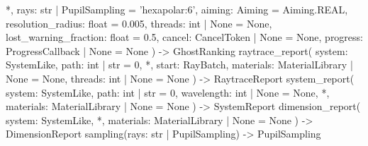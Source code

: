 \documentclass[11pt,a4paper,openany]{book}
\begin{document}
\begin{signatur}
    *,
    rays: str | PupilSampling = 'hexapolar:6',
    aiming: Aiming = Aiming.REAL,
    resolution_radius: float = 0.005,
    threads: int | None = None,
    lost_warning_fraction: float = 0.5,
    cancel: CancelToken | None = None,
    progress: ProgressCallback | None = None
) -> GhostRanking
raytrace_report(
    system: SystemLike,
    path: int | str = 0,
    *,
    start: RayBatch,
    materials: MaterialLibrary | None = None,
    threads: int | None = None
) -> RaytraceReport
system_report(
    system: SystemLike,
    path: int | str = 0,
    wavelength: int | None = None,
    *,
    materials: MaterialLibrary | None = None
) -> SystemReport
dimension_report(
    system: SystemLike,
    *,
    materials: MaterialLibrary | None = None
) -> DimensionReport
sampling(rays: str | PupilSampling) -> PupilSampling
\end{signatur}
\end{document}
